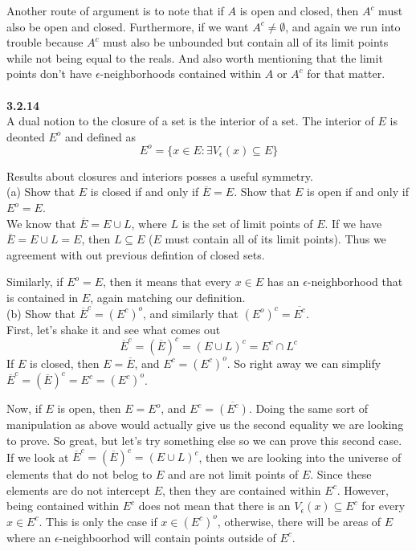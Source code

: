 Another route of argument is to note that if $A$ is open and closed, then $A^c$ must also be open and closed.
Furthermore, if we want $A^c \neq \emptyset$, and again we run into trouble because $A^c$ must also be unbounded
but contain all of its limit points while not being equal to the reals.
And also worth mentioning that the limit points don't have $\epsilon$-neighborhoods contained within $A$ or $A^c$ for that matter.
\\~\\



\textbf{3.2.14}
\\

A dual notion to the closure of a set is the interior of a set.
The interior of $E$ is deonted $E^o$ and defined as
$$
E^o = \{ x\in E : \exists V_\epsilon (x) \subseteq E \}
$$

Results about closures and interiors posses a useful symmetry.
\\

(a) Show that $E$ is closed if and only if $\overline{E} = E$.
Show that $E$ is open if and only if $E^o = E$.
\\

We know that $\overline{E} = E \cup L$, where $L$ is the set of limit points of $E$.
If we have $\overline{E} = E \cup L = E$, then $L \subseteq E$ ($E$ must contain all of its limit points).
Thus we agreement with out previous defintion of closed sets.

Similarly, if $E^o = E$, then it means that every $x\in E$ has an $\epsilon$-neighborhood that is contained
in $E$, again matching our definition.
\\


(b) Show that $\overline{E}^c = (E^c)^o$, and similarly that $(E^o)^c = \overline{E^c}$.
\\

First, let's shake it and see what comes out
$$
\overline{E}^c = (\overline{E})^c = (E \cup L)^c = E^c \cap L^c
$$
If $E$ is closed, then $E=\overline{E}$, and $E^c = (E^c)^o$.
So right away we can simplify $\overline{E}^c = (\overline{E})^c = E^c = (E^c)^o$.

Now, if $E$ is open, then $E = E^o$, and $E^c = \overline{(E^c)}$.
Doing the same sort of manipulation as above would actually give us the second equality we are looking to prove.
So great, but let's try something else so we can prove this second case.
If we look at $\overline{E}^c = (\overline{E})^c = (E \cup L)^c$, then we are looking into the universe of elements
that do not belog to $E$ and are not limit points of $E$.
Since these elements are do not intercept $E$, then they are contained within $E^c$.
However, being contained within $E^c$ does not mean that there is an $V_\epsilon (x) \subseteq E^c$
for every $x\in E^c$.
This is only the case if $x\in (E^c)^o$, otherwise, there will be areas of $E$ where an $\epsilon$-neighboorhod
will contain points outside of $E^c$.
\\~\\



